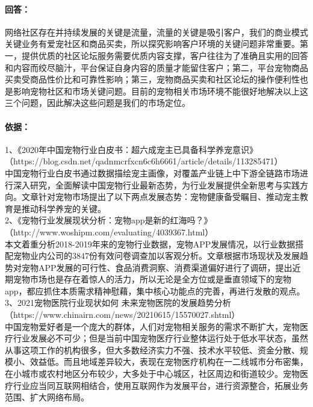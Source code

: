 \documentclass[a4paper]{ctexart}
\begin{document}
\begin{enumerate}[label=\alph*.]
  \paragraph{回答：}网络社区存在并持续发展的关键是流量，流量的关键是吸引客户，我们的商业模式关键业务有爱宠社区和商品买卖，所以探究影响客户环境的关键问题非常重要。第一，提供优质的社区论坛服务需要优质内容支撑，客户往往为了准确且实用的回答和内容而绞尽脑汁，平台保证自身内容的质量才能留住客户；第二，平台宠物商品买卖受商品性价比和可靠性影响；第三，宠物商品买卖和社区论坛的操作便利性也是影响宠物社区和市场关键问题。目前的宠物相关市场环境不能很好地解决以上这三个问题，因此解决这些问题是我们的市场定位。
  \paragraph{依据：}1、《2020年中国宠物行业白皮书：超六成宠主已具备科学养宠意识》\\
  （https://blog.csdn.net/qadnmcrfxcn6c6h6661/article/details/113285471）\\
  中国宠物行业白皮书通过数据描绘宠主画像，对覆盖产业链上中下游全链路市场进行深入研究，全面解读中国宠物行业最新态势，为行业发展提供全新思考与实践方向。文章针对宠物市场提出了以下两点发展态势：宠物健康备受瞩目、推动宠主教育是推动科学养宠的关键。\\
  2、《宠物行业发展现状分析：宠物app是新的红海吗？》\\（http://www.woshipm.com/evaluating/4039367.html）\\
  本文着重分析2018-2019年来的宠物行业数据，宠物APP发展情况，以行业数据搭配宠物业内公司的3847份有效问卷调查加以客观分析。文章根据市场现状及发展趋势对宠物APP发展的可行性、食品消费洞察、消费渠道偏好进行了调研，提出近期宠物市场也是存在着惊人的活力，所以无论是全方位或是垂直领域下的宠物app，都应抓住本质需求精神慰藉，集中核心功能点的完善，再进行发散的观点。\\
  3、2021宠物医院行业现状如何 未来宠物医院的发展趋势分析\\（https://www.chinairn.com/news/20210615/15570027.shtml）\\
  中国宠物爱好者是一个庞大的群体，人们对宠物相关服务的需求不断扩大，宠物医疗行业发展必不可少；但是当前中国宠物医疗行业整体运行处于低水平状态，虽然从事这项工作的机构很多，但大多数经济实力不强、技术水平较低、资金分散、规模小、效益低。而且地域差异较大，表现在宠物医疗机构在一二线城市分布密集，在小城市或农村地区分布较少，大多处于中心城区，社区周边和街道较少。宠物医疗行业应当同互联网相结合，使用互联网作为发展平台，进行资源整合，拓展业务范围、扩大网络布局。
\end{enumerate}
\end{document}
